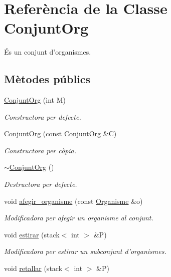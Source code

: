 \hypertarget{class_conjunt_org}{\section{Referència de la Classe Conjunt\-Org}
\label{class_conjunt_org}
}


És un conjunt d'organismes.  


\subsection*{Mètodes públics}
\begin{DoxyCompactItemize}
\item 
\hyperlink{class_conjunt_org_a573205d24e669356dc44462a6ef95d71}{Conjunt\-Org} (int M)
\begin{DoxyCompactList}\small\item\em Constructora per defecte. \end{DoxyCompactList}\item 
\hyperlink{class_conjunt_org_a4a0c1fe0378f0564295dcaa5e7d9bde2}{Conjunt\-Org} (const \hyperlink{class_conjunt_org}{Conjunt\-Org} \&C)
\begin{DoxyCompactList}\small\item\em Constructora per còpia. \end{DoxyCompactList}\item 
\hyperlink{class_conjunt_org_a547e57b6f00347fa89695c33e9dd7743}{$\sim$\-Conjunt\-Org} ()
\begin{DoxyCompactList}\small\item\em Destructora per defecte. \end{DoxyCompactList}\item 
void \hyperlink{class_conjunt_org_a02ff5962eff2674c76bd9218d7718695}{afegir\-\_\-organisme} (const \hyperlink{class_organisme}{Organisme} \&o)
\begin{DoxyCompactList}\small\item\em Modificadora per afegir un organisme al conjunt. \end{DoxyCompactList}\item 
void \hyperlink{class_conjunt_org_aef0a16451029a98453380acf35830738}{estirar} (stack$<$ int $>$ \&P)
\begin{DoxyCompactList}\small\item\em Modificadora per estirar un subconjunt d'organismes. \end{DoxyCompactList}\item 
void \hyperlink{class_conjunt_org_ad7bb405521b503d4f814385906043b29}{retallar} (stack$<$ int $>$ \&P)

\end{DoxyCompactItemize}
